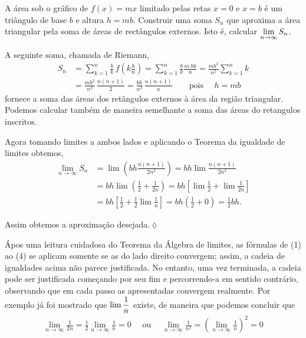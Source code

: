 \begin{exer}
A \'{a}rea sob o gr\'{a}fico de $f(x)=mx$ limitado pelas retas $x=0$ e $x=b$
\'{e} um tri\^{a}ngulo de base $b$ e altura $h=mb$. Construir uma soma $S_n$
que aproxima a \'{a}rea triangular pela soma de \'{a}reas de rect\^{a}ngulos
 externos. Isto \'{e}, calcular $\displaystyle{\lim_{n\to\infty}S_n}$.
\end{exer}

\solo A seguinte soma, chamada de Riemann,
\begin{align*}
    S_n&=\sum_{k=1}^{n}\frac{b}{k}\,f\left(k\frac{b}{n} \right)=
    \sum_{k=1}^{n}\frac{b}{k}\frac{m\;bk}{n}=
    \frac{mb^2}{n^2}\sum_{k=1}^{n}k\\[2ex]
    &=\frac{mb^2}{n^2}\,\frac{n(n+1)}{2}=\frac{bh}{n^2}\,\frac{n(n+1)}{n}
    \qquad \text{pois }\quad h=mb
\end{align*}
fornece a soma das \'{a}reas dos ret\^{a}ngulos externos \`{a} \'{a}rea da regi\~{a}o
triangular. Podemos calcular tamb\'{e}m de maneira semelhante a soma das
\'{a}reas do retangulos inscritos.

Agora tomando limites a ambos lados e aplicando o Teorema da
igualdade de limites obtemos,
\begin{align*}
    \lim_{n\to\infty}S_n&=\lim\left( bh\frac{n(n+1)}{2n^2}\right)
=bh\lim\frac{n(n+1)}{2n^2}\\[2ex]
&=bh\lim\left(\frac{1}{2}+\frac{1}{2n}\right)
=bh\left[\lim\frac{1}{2}+\lim\frac{1}{2n} \right]\\[2ex]
&=bh\left[\frac{1}{2}+\frac{1}{2}\lim\frac{1}{n} \right]
=bh\left(\frac{1}{2}+0 \right)=\frac{1}{2}bh.
\end{align*}

Assim obtemos a aproxima\c{c}\~{a}o desejada.\hfill \(\lozenge\)

\begin{obs}
\'{A}pos uma leitura cuidadosa do Teorema da Álgebra de limites, as
f\'{o}rmulas de (1) ao (4) se aplicam somente se as \seqs do lado
direito convergem; assim, a cadeia de igualdades acima n\~{a}o parece
justificada. No entanto, uma vez terminada, a cadeia pode ser
justificada come\c{c}ando por seu fim e percorrendo-a em sentido
contr\'{a}rio, observando que em cada passo as \seqs apresentadas
convergem realmente. Por exemplo j\'{a} foi mostrado que $\displaystyle{\lim
\frac{1}{n}}$ existe, de maneira que podemos concluir que
\begin{align*}
    \lim_{n\to\infty}\frac{1}{2n}=\frac{1}{2}\lim_{n\to\infty}\frac{1}{n}=0\quad \text{ ou } \quad
\lim_{n\to\infty}\frac{1}{n^2}=\left(\lim_{n\to\infty}\frac{1}{n}\right)^2=0
\end{align*}
\end{obs}

